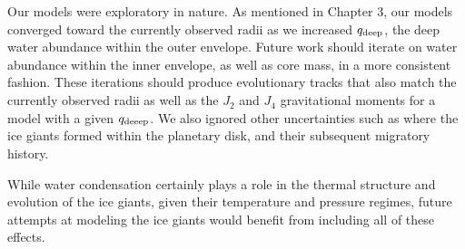 \documentclass[11pt]{ucscthesisbs}
\begin{document}
Our models were exploratory in nature. As mentioned in Chapter 3, our models converged toward the currently observed radii as we increased $q_{\rm deep}$, the deep water abundance within the outer envelope. Future work should iterate on water abundance within the inner envelope, as well as core mass, in a more consistent fashion. These iterations should produce evolutionary tracks that also match the currently observed radii as well as the $J_{2}$ and $J_{4}$ gravitational moments for a model with a given $q_{\rm deeep}$. We also ignored other uncertainties such as where the ice giants formed within the planetary disk, and their subsequent migratory history.

While water condensation certainly plays a role in the thermal structure and evolution of the ice giants, given their temperature and pressure regimes, future attempts at modeling the ice giants would benefit from including all of these effects.
 

\newcommand{\newblock}{}

 
\end{document}
